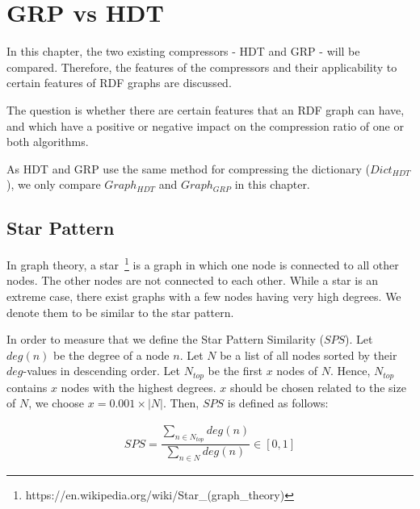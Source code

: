 \section{GRP vs HDT}\label{sec:approachGRPvsHDT}

In this chapter, the two existing compressors - HDT and GRP - will be compared. Therefore, the features of the compressors and their applicability to certain features of RDF graphs are discussed.

The question is whether there are certain features that an RDF graph can have, and which have a positive or negative impact on the compression ratio of one or both algorithms. 

As HDT and GRP use the same method for compressing the dictionary ($Dict_{HDT}$), we only compare $Graph_{HDT}$ and $Graph_{GRP}$ in this chapter.



\subsection{Star Pattern}\label{sec:approachStarPattern}

In graph theory, a star~\footnote{https://en.wikipedia.org/wiki/Star\_(graph\_theory)} is a graph in which one node is connected to all other nodes. The other nodes are not connected to each other. While a star is an extreme case, there exist graphs with a few nodes having very high degrees. We denote them to be similar to the star pattern. 

In order to measure that we define the Star Pattern Similarity ($SPS$). Let $deg(n)$ be the degree of a node $n$. Let $N$ be a list of all nodes sorted by their $deg$-values in descending order.  Let $N_{top}$ be the first $x$ nodes of $N$. Hence, $N_{top}$ contains $x$ nodes with the highest degrees. $x$ should be chosen related to the size of $N$, we choose $x=0.001 \times |N|$.  Then, $SPS$ is defined as follows:

\begin{align*}
SPS=\dfrac{\sum_{n \in N_{top}} deg(n)  }{\sum_{n \in N} deg(n)} \in [0,1]
\end{align*}

